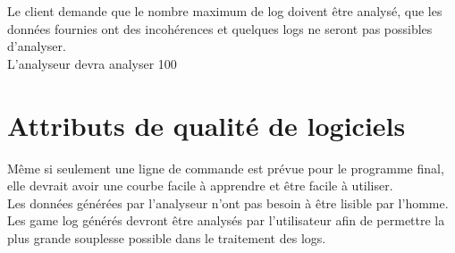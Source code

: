 \documentclass{scrreprt}
\begin{document}
Le client demande que le nombre maximum de log doivent être analysé, que les données fournies ont des incohérences et quelques logs ne seront pas possibles d'analyser.\\
L'analyseur devra analyser 100%
\section{Attributs de qualité de logiciels}

Même si seulement une ligne de commande est prévue pour le programme final, elle devrait avoir une courbe facile à apprendre et être facile à utiliser.\\
Les données générées par l'analyseur n’ont pas besoin à être lisible par l'homme.\\
Les game log générés devront être analysés par l'utilisateur afin de permettre la plus grande souplesse possible dans le traitement des logs.



\end{document}
